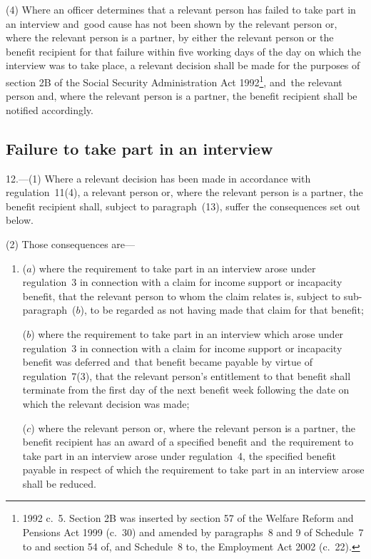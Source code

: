 \documentclass[12pt,a4paper]{article}
\begin{document}
(4) Where an officer determines that a relevant person has failed to take part in an interview and~good cause has not been shown by the relevant person or, where the relevant person is a partner, by either the relevant person or the benefit recipient for that failure within five working days of the day on which the interview was to take place, a relevant decision shall be made for the purposes of section 2B of the Social Security Administration Act 1992\footnote{1992 c.~5. Section 2B was inserted by section 57 of the Welfare Reform and Pensions Act 1999 (c.~30) and amended by paragraphs~8 and 9 of Schedule~7 to and section 54 of, and Schedule~8 to, the Employment Act 2002 (c.~22).}, and~the relevant person and, where the relevant person is a partner, the benefit recipient shall be notified accordingly.

\subsection[12. Failure to take part in an interview]{Failure to take part in an interview}

12.---(1)  Where a relevant decision has been made in accordance with regulation~11(4), a relevant person or, where the relevant person is a partner, the benefit recipient shall, subject to paragraph~(13), suffer the consequences set out below.

(2) Those consequences are—
\begin{enumerate}\item[]
($a$) where the requirement to take part in an interview arose under regulation~3 in connection with a claim for income support or incapacity benefit, that the relevant person to whom the claim relates is, subject to sub-paragraph~($b$), to be regarded as not having made that claim for that benefit;

($b$) where the requirement to take part in an interview which arose under regulation~3 in connection with a claim for income support or incapacity benefit was deferred and~that benefit became payable by virtue of regulation~7(3), that the relevant person’s entitlement to that benefit shall terminate from the first day of the next benefit week following the date on which the relevant decision was made;

($c$) where the relevant person or, where the relevant person is a partner, the benefit recipient has an award of a specified benefit and~the requirement to take part in an interview arose under regulation~4, the specified benefit payable in respect of which the requirement to take part in an interview arose shall be reduced.
\end{enumerate}
\end{document}
